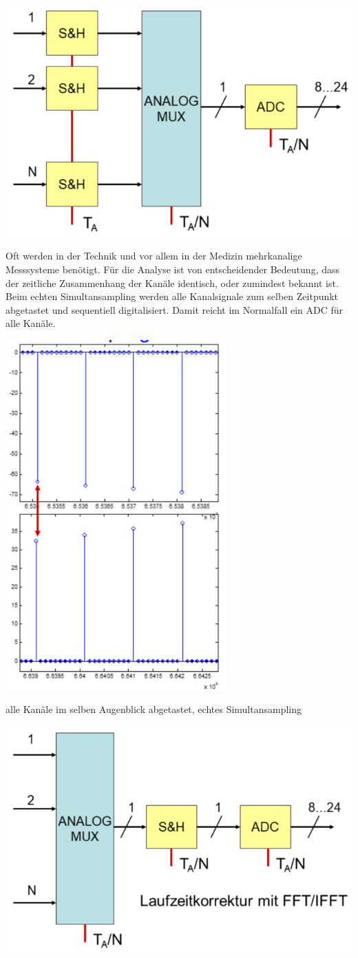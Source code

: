 \documentclass[a4paper]{article}
\begin{document}
\begin{multicols}{3}
  \begin{itemize*}
    \item \includegraphics[width=.5\linewidth]{Assets/Biosignalverarbeitung-Mehrkanalsysteme.png}
    \item Oft werden in der Technik und vor allem in der Medizin mehrkanalige Messsysteme benötigt. Für die Analyse ist von entscheidender Bedeutung, dass der zeitliche Zusammenhang der Kanäle identisch, oder zumindest bekannt ist. Beim echten Simultansampling werden alle Kanalsignale zum selben Zeitpunkt abgetastet und sequentiell digitalisiert. Damit reicht im Normalfall ein ADC für alle Kanäle.
    \item \includegraphics[width=.5\linewidth]{Assets/Biosignalverarbeitung-Mehrkanalsysteme2.png}
    \begin{itemize*}
      \item alle Kanäle im selben Augenblick abgetastet, echtes Simultansampling
    \end{itemize*}
    \item \includegraphics[width=.5\linewidth]{Assets/Biosignalverarbeitung-Mehrkanalsysteme3.png}

\end{itemize*}
\end{multicols}
\end{document}
